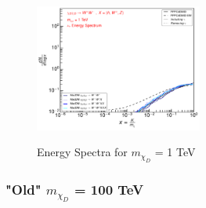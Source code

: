 \documentclass[epj,nopacs,fleqn]{svjour}
\begin{document}
\begin{figure}[!b]
\subfigure
{\includegraphics[width=0.49\textwidth]{Fig/1TeV/1_neutrinos_tau_PPPC_Comparison_xdxd_fotone_1.pdf}}
\caption{Energy Spectra for $m_{\chi_D}$ = 1 TeV}
\label{simp1tev}
\end{figure}
%
%
%
\clearpage
\subsubsection{"Old" $m_{\chi_D}$ = 100 TeV}
\end{document}
